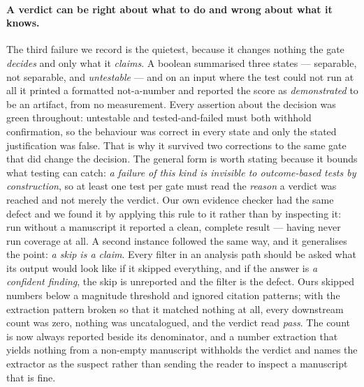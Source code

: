 \documentclass[11pt]{article}
\begin{document}
\paragraph{A verdict can be right about what to do and wrong about what it knows.} The
third failure we record is the quietest, because it changes nothing the gate
\emph{decides} and only what it \emph{claims}. A boolean summarised three states ---
separable, not separable, and \emph{untestable} --- and on an input where the test
could not run at all it printed a formatted not-a-number and reported the score as
\emph{demonstrated} to be an artifact, from no measurement. Every assertion about the
decision was green throughout: untestable and tested-and-failed must both withhold
confirmation, so the behaviour was correct in every state and only the stated
justification was false. That is why it survived two corrections to the same gate that
did change the decision. The general form is worth stating because it bounds what
testing can catch: \emph{a failure of this kind is invisible to outcome-based tests by
construction}, so at least one test per gate must read the \emph{reason} a verdict was
reached and not merely the verdict. Our own evidence checker had the same defect and
we found it by applying this rule to it rather than by inspecting it: run without a
manuscript it reported a clean, complete result --- having never run coverage at all.
A second instance followed the same way, and it generalises the point: \emph{a skip is
a claim}. Every filter in an analysis path should be asked what its output would look
like if it skipped everything, and if the answer is \emph{a confident finding}, the
skip is unreported and the filter is the defect. Ours skipped numbers below a
magnitude threshold and ignored citation patterns; with the extraction pattern broken
so that it matched nothing at all, every downstream count was zero, nothing was
uncatalogued, and the verdict read \emph{pass}. The count is now always reported beside
its denominator, and a number extraction that yields nothing from a non-empty
manuscript withholds the verdict and names the extractor as the suspect rather than
sending the reader to inspect a manuscript that is fine.
\end{document}
